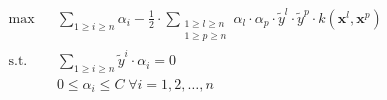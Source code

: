                 \begin{equation}
                    \label{eq::kernel_soft_svm_dual}
                    \begin{aligned}
                        & \max
                        & & \sum_{1\geq i \geq n} \alpha_i - \frac{1}{2}\cdot\sum_{\substack{1\geq l \geq n\\1\geq p \geq n}}\alpha_l\cdot\alpha_p\cdot\tilde{y}^l\cdot\tilde{y}^p\cdot k(\bm{x}^l, \bm{x}^p)\\
                        &\text{s.t.} & & \sum_{1\geq i \geq n}\tilde{y}^i\cdot\alpha_i=0 \\
                        & & & 0 \leq \alpha_i \leq C \; \forall i=1,2,\dots,n
                        \end{aligned}
                \end{equation}

